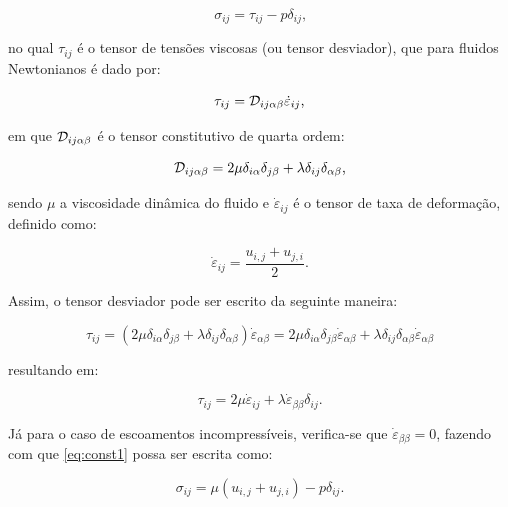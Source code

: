 \begin{equation}
    \sigma_{ij}=\tau_{ij}-p\delta_{ij}\text{,}\label{eq:const1}
\end{equation}

\noindent no qual $\tau_{ij}$ é o tensor de tensões viscosas (ou tensor desviador), que para fluidos Newtonianos é dado por:

\begin{equation}
    \tau_{ij}=\mathcal{D}_{ij\alpha\beta}\dot{\varepsilon}_{ij}\text{,}
\end{equation}

\noindent em que $\mathcal{D}_{ij\alpha\beta}$ é o tensor constitutivo de quarta ordem:

\begin{equation}
    \mathcal{D}_{ij\alpha\beta}=2\mu\delta_{i\alpha}\delta_{j\beta}+\lambda\delta_{ij}\delta_{\alpha\beta}\text{,}
\end{equation}

\noindent sendo $\mu$ a viscosidade dinâmica do fluido e $\dot{\varepsilon}_{ij}$ é o tensor de taxa de deformação, definido como:

\begin{equation}
    \dot{\varepsilon}_{ij}=\frac{u_{i,j}+u_{j,i}}{2}\text{.}\label{eq:deftax1}
\end{equation}

Assim, o tensor desviador pode ser escrito da seguinte maneira:

\[\tau_{ij}=(2\mu\delta_{i\alpha}\delta_{j\beta}+\lambda\delta_{ij}\delta_{\alpha\beta})\dot{\varepsilon}_{\alpha\beta}=2\mu\delta_{i\alpha}\delta_{j\beta}\dot{\varepsilon}_{\alpha\beta}+\lambda\delta_{ij}\delta_{\alpha\beta}\dot{\varepsilon}_{\alpha\beta}\]

\noindent resultando em:

\begin{equation}
    \tau_{ij}=2\mu\dot{\varepsilon}_{ij}+\lambda\dot{\varepsilon}_{\beta\beta}\delta_{ij}\text{.}
\end{equation}

Já para o caso de escoamentos incompressíveis, verifica-se que $\dot{\varepsilon}_{\beta\beta}=0$, fazendo com que \ref{eq:const1} possa ser escrita como:

\begin{equation}
    \sigma_{ij}=\mu(u_{i,j}+u_{j,i})-p\delta_{ij}\text{.}\label{eq:ModConst}
\end{equation}